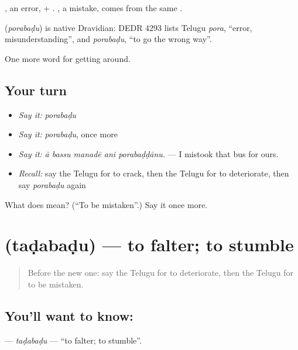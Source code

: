 , an error, + . , a mistake, comes from the same .

\begin{cousinweb}
\textbf{} (\emph{porabaḍu}) is native Dravidian: DEDR 4293 lists Telugu \emph{pora}, \textquotedblleft{}error, misunderstanding\textquotedblright{}, and \emph{porabaḍu}, \textquotedblleft{}to go the wrong way\textquotedblright{}.
\end{cousinweb}

\begin{grammarlens}[title={What you've built}]
One more word for getting around.
\end{grammarlens}

\subsection*{Your turn}
\begin{itemize}
\raggedright
  \item \emph{Say it:} \emph{porabaḍu}
  \item \emph{Say it:} \emph{porabaḍu}, once more
  \item \emph{Say it:} \emph{ā bassu manadē ani porabaḍḍānu.} — I mistook that bus for ours.
  \item \emph{Recall:} say the Telugu for to crack, then the Telugu for to deteriorate, then say \emph{porabaḍu} again
\end{itemize}

\begin{tcolorbox}[breakable,colback=teal!4,colframe=teal!35!black,title={Before you move on}]
What does  mean? (\textquotedblleft{}To be mistaken\textquotedblright{}.) Say it once more.
\end{tcolorbox}
\section[\texorpdfstring{\te{తడబడు} (taḍabaḍu)}{తడబడు (taḍabaḍu)}]{ (taḍabaḍu) — to falter; to stumble}

\label{lesson:TE-C492-tadabadu}



\begin{quote}
Before the new one: say the Telugu for to deteriorate, then the Telugu for to be mistaken.
\end{quote}

\subsection*{You'll want to know: }
\textbf{} — \emph{taḍabaḍu} — \textquotedblleft{}to falter; to stumble\textquotedblright{}.

